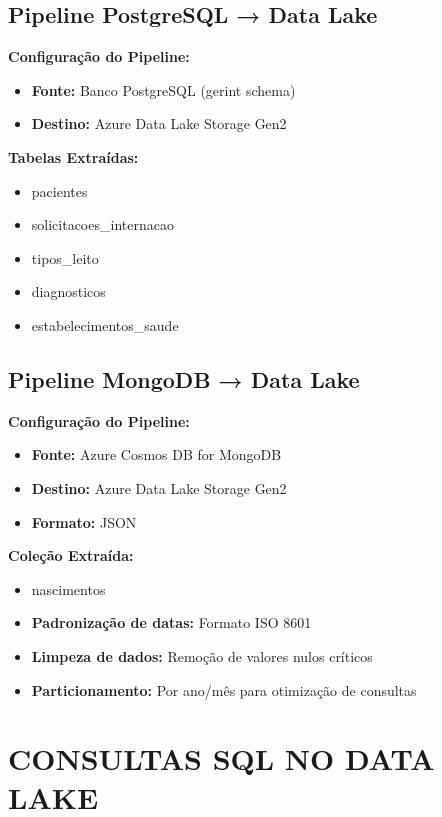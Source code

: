 \documentclass[12pt,a4paper]{article}
\begin{document}
\subsection{Pipeline PostgreSQL → Data Lake}

\textbf{Configuração do Pipeline:}
\begin{itemize}
    \item \textbf{Fonte:} Banco PostgreSQL (gerint schema)
    \item \textbf{Destino:} Azure Data Lake Storage Gen2
\end{itemize}

\textbf{Tabelas Extraídas:}
\begin{itemize}
    \item pacientes
    \item solicitacoes\_internacao
    \item tipos\_leito
    \item diagnosticos
    \item estabelecimentos\_saude
\end{itemize}

\subsection{Pipeline MongoDB → Data Lake}

\textbf{Configuração do Pipeline:}
\begin{itemize}
    \item \textbf{Fonte:} Azure Cosmos DB for MongoDB
    \item \textbf{Destino:} Azure Data Lake Storage Gen2
    \item \textbf{Formato:} JSON
\end{itemize}

\textbf{Coleção Extraída:}
\begin{itemize}
    \item nascimentos
\end{itemize}


\begin{itemize}
    \item \textbf{Padronização de datas:} Formato ISO 8601
    \item \textbf{Limpeza de dados:} Remoção de valores nulos críticos
    \item \textbf{Particionamento:} Por ano/mês para otimização de consultas
\end{itemize}

\section{CONSULTAS SQL NO DATA LAKE}
\end{document}

